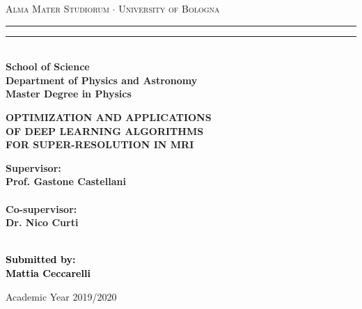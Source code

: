 \documentclass[12pt,a4paper]{report}
\begin{document}
\begin{titlepage}
%
%
%
%
\begin{center}
{{\Large{\textsc{Alma Mater Studiorum $\cdot$ University of  Bologna}}}} 
\rule[0.1cm]{15.8cm}{0.1mm}
\rule[0.5cm]{15.8cm}{0.6mm}
\\\vspace{3mm}
{\small{\bf School of Science \\
Department of Physics and Astronomy\\
Master Degree in Physics}}
\end{center}

\vspace{17mm}

\begin{center}
%
%
{\LARGE{\bf OPTIMIZATION AND APPLICATIONS\\
OF DEEP LEARNING ALGORITHMS\\
\vspace{3mm}
FOR SUPER-RESOLUTION IN MRI}}\\
\end{center}

\vspace{30mm} \par \noindent

\begin{minipage}[t]{0.47\textwidth}

{\large{\bf Supervisor: \vspace{2mm}\\
Prof. Gastone Castellani\\\\

\bf Co-supervisor:
\vspace{2mm}
\\
Dr. Nico Curti\\\\}}
\end{minipage}
%
\hfill
%
\begin{minipage}[t]{0.47\textwidth}\raggedleft \textcolor{black}{
{\large{\bf Submitted by:
\vspace{2mm}\\
Mattia Ceccarelli}}}
\end{minipage}

\vspace{40mm}

\begin{center}

Academic Year 2019/2020
\end{center}

\end{titlepage}
\end{document}
